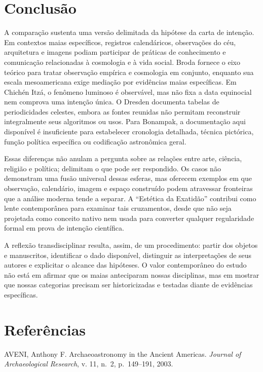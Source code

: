 \documentclass[
  brazilian,
]{article}
\begin{document}
\section{Conclusão}\label{conclusuxe3o}

A comparação sustenta uma versão delimitada da hipótese da carta de
intenção. Em contextos maias específicos, registros calendáricos,
observações do céu, arquitetura e imagens podiam participar de práticas
de conhecimento e comunicação relacionadas à cosmologia e à vida social.
Broda fornece o eixo teórico para tratar observação empírica e
cosmologia em conjunto, enquanto sua escala mesoamericana exige mediação
por evidências maias específicas. Em Chichén Itzá, o fenômeno luminoso é
observável, mas não fixa a data equinocial nem comprova uma intenção
única. O Dresden documenta tabelas de periodicidades celestes, embora as
fontes reunidas não permitam reconstruir integralmente seus algoritmos
ou usos. Para Bonampak, a documentação aqui disponível é insuficiente
para estabelecer cronologia detalhada, técnica pictórica, função
política específica ou codificação astronômica geral.

Essas diferenças não anulam a pergunta sobre as relações entre arte,
ciência, religião e política; delimitam o que pode ser respondido. Os
casos não demonstram uma fusão universal dessas esferas, mas oferecem
exemplos em que observação, calendário, imagem e espaço construído podem
atravessar fronteiras que a análise moderna tende a separar. A
``Estética da Exatidão'' contribui como lente contemporânea para
examinar tais cruzamentos, desde que não seja projetada como conceito
nativo nem usada para converter qualquer regularidade formal em prova de
intenção científica.

A reflexão transdisciplinar resulta, assim, de um procedimento: partir
dos objetos e manuscritos, identificar o dado disponível, distinguir as
interpretações de seus autores e explicitar o alcance das hipóteses. O
valor contemporâneo do estudo não está em afirmar que os maias
anteciparam nossas disciplinas, mas em mostrar que nossas categorias
precisam ser historicizadas e testadas diante de evidências específicas.

\section{Referências}\label{referuxeancias}

AVENI, Anthony F. Archaeoastronomy in the Ancient Americas.
\emph{Journal of Archaeological Research}, v. 11, n.~2, p.~149--191,
2003.
\end{document}
